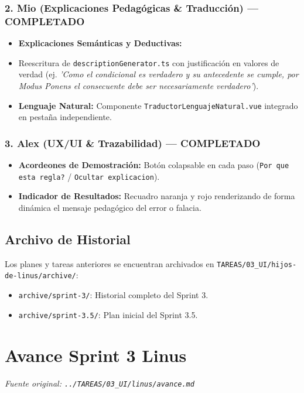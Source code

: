 \documentclass[11pt,a4paper,openany]{book}
\begin{document}
\subsubsection{2. Mio (Explicaciones Pedagógicas \& Traducción) ---  COMPLETADO}
\begin{itemize}[leftmargin=*]
\item \textbf{Explicaciones Semánticas y Deductivas:}
\item Reescritura de \texttt{descriptionGenerator.ts} con justificación en valores de verdad (ej. \textit{'Como el condicional es verdadero y su antecedente se cumple, por Modus Ponens el consecuente debe ser necesariamente verdadero'}).
\item \textbf{Lenguaje Natural:} Componente \texttt{TraductorLenguajeNatural.vue} integrado en pestaña independiente.
\end{itemize}

\subsubsection{3. Alex (UX/UI \& Trazabilidad) ---  COMPLETADO}
\begin{itemize}[leftmargin=*]
\item \textbf{Acordeones de Demostración:} Botón colapsable en cada paso (\texttt{Por que esta regla?} / \texttt{Ocultar explicacion}).
\item \textbf{Indicador de Resultados:} Recuadro naranja y rojo renderizando de forma dinámica el mensaje pedagógico del error o falacia.
\end{itemize}

\hrulefill

\subsection{Archivo de Historial}
Los planes y tareas anteriores se encuentran archivados en \texttt{TAREAS/03\_UI/hijos-de-linus/archive/}:
\begin{itemize}[leftmargin=*]
\item \texttt{archive/sprint-3/}: Historial completo del Sprint 3.
\item \texttt{archive/sprint-3.5/}: Plan inicial del Sprint 3.5.
\end{itemize}


\section{Avance Sprint 3 Linus}
\textit{Fuente original: \texttt{../TAREAS/03\_UI/linus/avance.md}}
\end{document}
